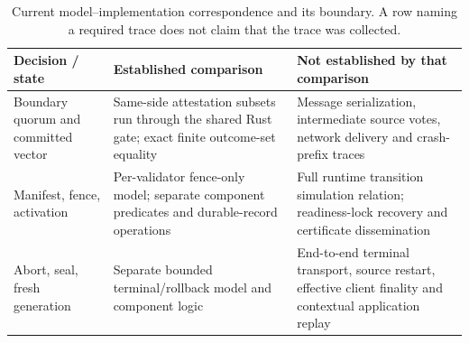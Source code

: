 \begin{table}[t]
\centering
\caption{Current model--implementation correspondence and its boundary. A row naming a required
trace does not claim that the trace was collected.}
\label{tab:conformance-boundary}
\small
\renewcommand{\arraystretch}{1.12}
\begin{tabularx}{\textwidth}{@{}L{0.23\textwidth}YL{0.34\textwidth}@{}}
\toprule
\textbf{Decision / state} & \textbf{Established comparison} & \textbf{Not established by that comparison} \\
\midrule
Boundary quorum and committed vector & Same-side attestation subsets run through the shared Rust gate; exact finite outcome-set equality & Message serialization, intermediate source votes, network delivery and crash-prefix traces \\
Manifest, fence, activation & Per-validator fence-only model; separate component predicates and durable-record operations & Full runtime transition simulation relation; readiness-lock recovery and certificate dissemination \\
Abort, seal, fresh generation & Separate bounded terminal/rollback model and component logic & End-to-end terminal transport, source restart, effective client finality and contextual application replay \\
\bottomrule
\end{tabularx}
\end{table}

